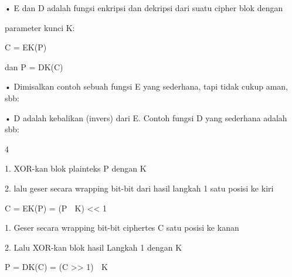 \documentclass{article}
\begin{document}

• E dan D adalah fungsi enkripsi dan dekripsi dari suatu cipher blok dengan 

parameter kunci K:



C = EK(P) 

dan P = DK(C)

• Dimisalkan contoh sebuah fungsi E yang sederhana, tapi tidak cukup aman, sbb:

• D adalah kebalikan (invers) dari E. Contoh fungsi D yang sederhana adalah sbb:



4

1.  XOR-kan blok plainteks P dengan K 

   2.  lalu geser secara wrapping bit-bit dari hasil langkah 1 satu posisi ke kiri


C = EK(P) = (P  K) << 1

1. Geser secara wrapping  bit-bit ciphertes C  satu posisi ke kanan

   2. Lalu XOR-kan blok hasil Langkah 1 dengan  K 


P = DK(C) = (C  >> 1)  K
\end{document}

